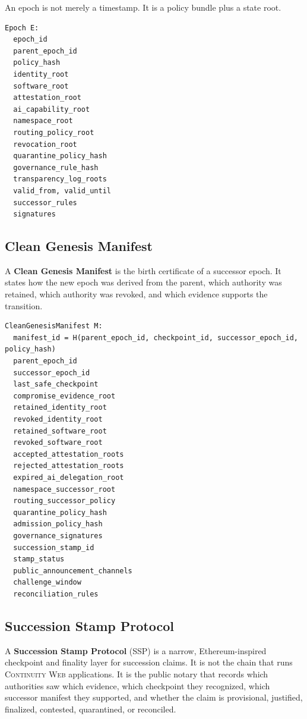 \documentclass[11pt,letterpaper]{article}
\newcommand{\CW}{\textsc{Continuity Web}}
\newcommand{\Term}[1]{\textbf{#1}}
\begin{document}
An epoch is not merely a timestamp. It is a policy bundle plus a state root.

\begin{lstlisting}[title={\textbf{Canonical epoch object}}]
Epoch E:
  epoch_id
  parent_epoch_id
  policy_hash
  identity_root
  software_root
  attestation_root
  ai_capability_root
  namespace_root
  routing_policy_root
  revocation_root
  quarantine_policy_hash
  governance_rule_hash
  transparency_log_roots
  valid_from, valid_until
  successor_rules
  signatures
\end{lstlisting}

\subsection{Clean Genesis Manifest}

A \Term{Clean Genesis Manifest} is the birth certificate of a successor epoch. It states how the new epoch was derived from the parent, which authority was retained, which authority was revoked, and which evidence supports the transition.

\begin{lstlisting}[title={\textbf{Clean Genesis Manifest structure}}]
CleanGenesisManifest M:
  manifest_id = H(parent_epoch_id, checkpoint_id, successor_epoch_id, policy_hash)
  parent_epoch_id
  successor_epoch_id
  last_safe_checkpoint
  compromise_evidence_root
  retained_identity_root
  revoked_identity_root
  retained_software_root
  revoked_software_root
  accepted_attestation_roots
  rejected_attestation_roots
  expired_ai_delegation_root
  namespace_successor_root
  routing_successor_policy
  quarantine_policy_hash
  admission_policy_hash
  governance_signatures
  succession_stamp_id
  stamp_status
  public_announcement_channels
  challenge_window
  reconciliation_rules
\end{lstlisting}

\subsection{Succession Stamp Protocol}

A \Term{Succession Stamp Protocol} (SSP) is a narrow, Ethereum-inspired checkpoint and finality layer for succession claims. It is not the chain that runs \CW{} applications. It is the public notary that records which authorities saw which evidence, which checkpoint they recognized, which successor manifest they supported, and whether the claim is provisional, justified, finalized, contested, quarantined, or reconciled.
\end{document}
